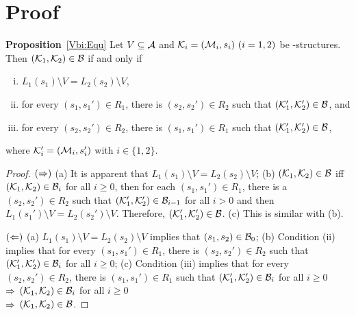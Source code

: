 \documentclass{article}
\begin{document}
\section{Proof}
\textbf{Proposition}~\ref{Vbi:Equ}
Let $V\subseteq\cal A$
and ${\cal K}_i=({\cal M}_i,s_i)~(i=1,2)$ be \MPK-structures.
Then $({\cal K}_1,{\cal K}_2)\in\cal B$ if and only if
  \begin{enumerate}[(i)]
    \item $L_1(s_1)\setminus V = L_2(s_2)\setminus V$,
    \item for every $(s_1,s_1')\in R_1$, there is $(s_2,s_2')\in R_2$
    such that $({\cal K}_1',{\cal K}_2')\in {\cal B}$, and
    \item for every $(s_2,s_2')\in R_2$, there is $(s_1,s_1')\in R_1$
    such that $({\cal K}_1',{\cal K}_2')\in {\cal B}$,
   \end{enumerate}
 where ${\cal K}_i'=({\cal M}_i,s_i')$ with $i\in\{1,2\}$.\\
\begin{proof}
$(\Rightarrow)$
(a) It is apparent that $L_1(s_1)\setminus V = L_2(s_2)\setminus V$;
(b) %
$({\cal K}_1, {\cal K}_2) \in {\cal B}$ iff $({\cal K}_1, {\cal K}_2) \in {\cal B}_i$ for all $i \geq 0$, then for each $(s_1, s_1') \in R_1$, there is a $(s_2, s_2')\in R_2$  such that  $({\cal K}_1', {\cal K}_2') \in {\cal B}_{i-1}$ for all $i > 0$ and then $L_1(s_1')\setminus V = L_2(s_2')\setminus V$. Therefore, $({\cal K}_1', {\cal K}_2') \in {\cal B}$.
(c) %
 This is similar with (b).

$(\Leftarrow)$ (a) $L_1(s_1)\setminus V = L_2(s_2)\setminus V$ implies that $(s_1, s_2) \in {\cal B}_0$;
(b) Condition (ii) implies that for every $(s_1,s_1')\in R_1$, there is $(s_2,s_2')\in R_2$
    such that $({\cal K}_1',{\cal K}_2')\in {\cal B}_i$ for all $i \geq 0$;
(c) Condition (iii) implies that for every $(s_2,s_2')\in R_2$, there is $(s_1,s_1')\in R_1$
    such that $({\cal K}_1',{\cal K}_2')\in {\cal B}_i$ for all $i \geq 0$\\
$\Rightarrow$ $({\cal K}_1, {\cal K}_2) \in {\cal B}_i$ for all $i \geq 0$\\
$\Rightarrow$ $({\cal K}_1,{\cal K}_2)\in\cal B$.
\end{proof}
\end{document}
